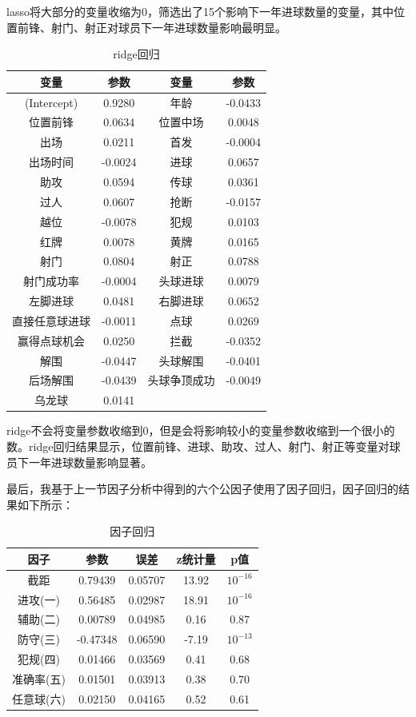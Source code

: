 \documentclass[12pt,a4paper,onecolumn]{article}
\begin{document}
lasso将大部分的变量收缩为0，筛选出了15个影响下一年进球数量的变量，其中位置前锋、射门、射正对球员下一年进球数量影响最明显。

\begin{table}[H]
\centering
\caption{ridge回归}
\begin{tabular}{cccc}
  \hline
	变量 &参数 &变量 &参数 \\\hline
(Intercept)&     0.9280& 年龄    &       -0.0433\\
位置前锋&        0.0634& 位置中场       & 0.0048\\
出场   &         0.0211& 首发   &        -0.0004\\
出场时间  &     -0.0024 &进球      &      0.0657\\
助攻     &      0.0594& 传球      &      0.0361\\
过人      &      0.0607& 抢断      &     -0.0157\\
越位       &    -0.0078 &犯规       &     0.0103\\
红牌        &    0.0078 &黄牌        &    0.0165\\
射门    &        0.0804 &射正         &   0.0788\\
射门成功率  &   -0.0004 &头球进球     &   0.0079\\
左脚进球    &    0.0481 &右脚进球 &       0.0652\\
直接任意球进球& -0.0011 &点球       &     0.0269\\
赢得点球机会  &  0.0250 &拦截       &    -0.0352\\
解围       &    -0.0447 &头球解围  &     -0.0401\\
后场解围      & -0.0439 &头球争顶成功  & -0.0049\\
乌龙球     &     0.0141 & &\\
  \hline
  \end{tabular}
\end{table}

ridge不会将变量参数收缩到0，但是会将影响较小的变量参数收缩到一个很小的数。ridge回归结果显示，位置前锋、进球、助攻、过人、射门、射正等变量对球员下一年进球数量影响显著。

最后，我基于上一节因子分析中得到的六个公因子使用了因子回归，因子回归的结果如下所示：

\begin{table}[H]
\centering
\caption{因子回归}
\begin{tabular}{ccccc}
  \hline
	因子 &参数&误差&z统计量&p值 \\\hline
 截距 & 0.79439 &  0.05707 &  13.92 & $10^{-16}$\\
 进攻(一)&    0.56485& 0.02987&18.91& $10^{-16}$ \\
 辅助(二)&   0.00789 &0.04985 &0.16 & 0.87  \\
 防守(三)&   -0.47348 &0.06590&-7.19& $10^{-13}$ \\
 犯规(四)&    0.01466 &0.03569 &0.41& 0.68  \\
 准确率(五)&   0.01501 &0.03913 &0.38 & 0.70  \\
 任意球(六)&  0.02150 &0.04165 &0.52 & 0.61  \\
  \hline
  \end{tabular}
\end{table}
\end{document}
